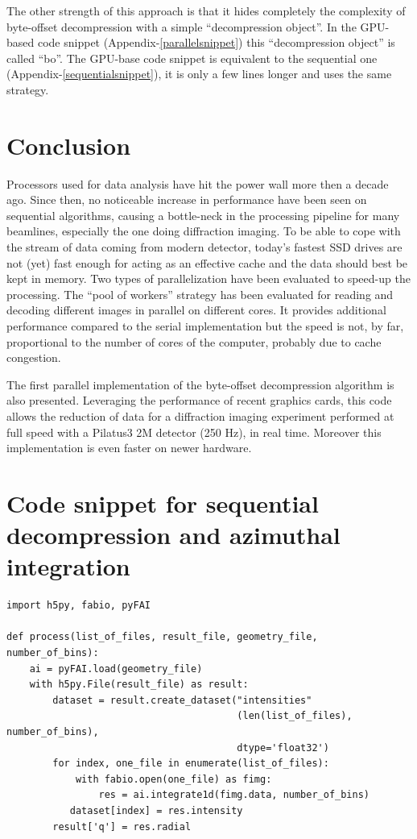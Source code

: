 \documentclass[preprint]{iucr}              %
\begin{document}
The other strength of this approach is that it hides completely the
complexity of byte-offset decompression with a simple ``decompression object''.
In the GPU-based code snippet (Appendix-\ref{parallelsnippet}) this ``decompression object'' is called ``bo''.
The GPU-base code snippet is equivalent to the sequential one (Appendix-\ref{sequentialsnippet}), it is only a few lines longer and uses the same strategy.

\section{Conclusion}

Processors used for data analysis have hit the power wall more then
a  decade ago.
Since then, no noticeable increase in performance have been seen on
sequential algorithms, causing a bottle-neck in the processing
pipeline for many beamlines, especially the one doing diffraction imaging.
To be able to cope with the stream of data coming from modern detector,
today's fastest SSD drives are not (yet) fast  enough for acting as an
effective cache and the data should best be kept in memory.
Two types of parallelization have been evaluated to speed-up the processing.
The ``pool of workers'' strategy has been evaluated for reading and decoding
different images  in parallel on different cores.
It provides additional performance compared to the serial implementation but
the speed is not, by far, proportional to the number of cores of the computer,
probably due to cache congestion.

The first parallel implementation of the byte-offset decompression
algorithm is also presented.
Leveraging the performance of recent graphics cards, this code allows the reduction
of data for a diffraction imaging experiment performed at full speed with
a Pilatus3 2M detector (250 Hz), in real time.
Moreover this implementation is even faster on newer hardware.

\appendix
\section{Code snippet for sequential decompression and azimuthal integration}

\begin{minipage}{\linewidth}
\label{sequentialsnippet}
\begin{verbatim}
import h5py, fabio, pyFAI

def process(list_of_files, result_file, geometry_file, number_of_bins):
    ai = pyFAI.load(geometry_file)
    with h5py.File(result_file) as result:
        dataset = result.create_dataset("intensities"
                                        (len(list_of_files), number_of_bins),
                                        dtype='float32')
        for index, one_file in enumerate(list_of_files):
            with fabio.open(one_file) as fimg:
                res = ai.integrate1d(fimg.data, number_of_bins)
           dataset[index] = res.intensity
        result['q'] = res.radial
\end{verbatim}
\end{minipage}
\end{document}
